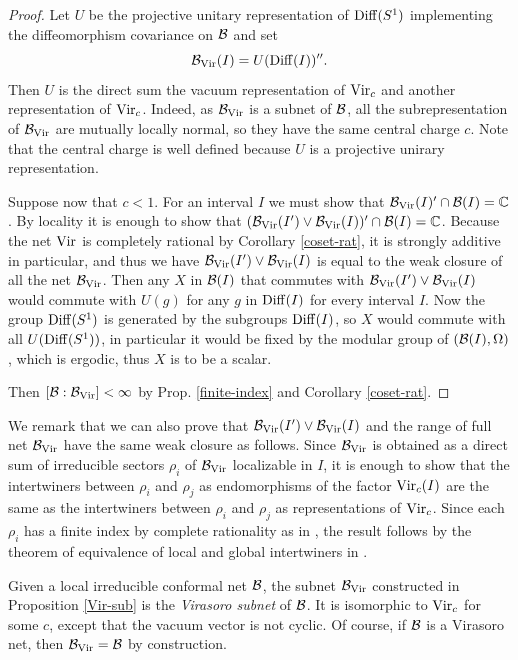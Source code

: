 \documentclass[12pt]{article}
\def\Diff{{\rm Diff}}
\def\Vir{{\rm Vir}}
\def\Om{\Omega}
\def\M{{\cal B}}
\def\C{{\mathbb C}}
\begin{document}
\begin{proof}
Let $U$ be the projective unitary representation of $\Diff(S^1)$ implementing the 
diffeomorphism covariance on $\M$ and set
\[
\M_{\Vir}(I)=U(\Diff(I))''.
\]
Then $U$ is the direct sum the vacuum representation of $\Vir_c$ and 
another representation of $\Vir_c$. Indeed, as $\M_{\Vir}$ is a subnet 
of $\M$, all the subrepresentation of $\M_{\Vir}$ are mutually locally 
normal, so they have the same central charge $c$.
Note that the central charge is well defined because $U$ is a 
projective unirary representation.

Suppose now that $c<1$.
For an interval $I$ we must show that $\M_{\Vir}(I)'\cap \M(I) = \C$.
By locality it is enough to show that
$(\M_{\Vir}(I')\vee  \M_{\Vir}(I))'\cap \M(I) = \C$.
Because the net $\Vir$ is completely rational by
Corollary \ref{coset-rat}, it is strongly additive
in particular, and thus we have
$\M_{\Vir}(I')\vee  \M_{\Vir}(I)$
is equal to the weak closure of all the net $\M_{\Vir}$.
Then any $X$ in $\M(I)$ that
commutes with $\M_{\Vir}(I')\vee\M_{\Vir}(I)$ would commute 
with $U(g)$ for any $g$ in
$\Diff(I)$ for every interval $I$. Now the group $\Diff(S^1)$
is generated by  the subgroups $\Diff(I)$, so $X$ would commute with all
$U(\Diff(S^1) )$, in particular it would be fixed 
by the modular group of $(\M(I),\Om)$,
which is ergodic, thus $X$ is to be a scalar.

Then $[\M:\M_{\Vir}]<\infty$ by Prop. \ref {finite-index} 
and Corollary \ref{coset-rat}.
\end{proof}

We remark that we can also prove
that $\M_{\Vir}(I')\vee \M_{\Vir}(I)$ and the range of
full net $\M_{\Vir}$ have the same weak closure as follows.
Since $\M_{\Vir}$ is obtained as a direct 
sum of irreducible sectors
$\rho_i$ of $\M_{\Vir}$ localizable in $I$, it is enough to show 
that the intertwiners between
$\rho_i$ and $\rho_j$ as endomorphisms of the factor $\Vir_c(I)$
are the same as the
intertwiners between $\rho_i$ and $\rho_j$
as representations of $\Vir_c$. Since each $\rho_i$
has a finite index by complete rationality as in \cite[Corollary 39]{KLM},
the result follows by the theorem of
equivalence of local and global intertwiners in \cite{GL2}.

Given a local irreducible conformal net $\M$, the subnet $\M_{\Vir}$ 
constructed in Proposition \ref{Vir-sub} is the {\it Virasoro subnet} 
of $\M$. It is isomorphic to $\Vir_c$ for some $c$, except that the 
vacuum vector is not cyclic. Of course, if $\M$ is a Virasoro net, 
then $\M_{\Vir}=\M$ by construction.
\end{document}
